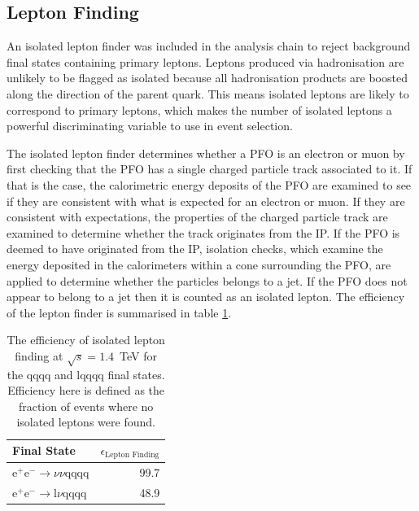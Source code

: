 \begin{figure}
\label{fig:allchi2jetalgoideal1400GeV}
\end{figure}


\subsection{Lepton Finding} 
\label{sec:isolatedleptonfinding}
An isolated lepton finder was included in the analysis chain to reject background final states containing primary leptons.  Leptons produced via hadronisation are unlikely to be flagged as isolated because all hadronisation products are boosted along the direction of the parent quark.  This means isolated leptons are likely to correspond to primary leptons, which makes the number of isolated leptons a powerful discriminating variable to use in event selection.  

The isolated lepton finder determines whether a PFO is an electron or muon by first checking that the PFO has a single charged particle track associated to it.  If that is the case, the calorimetric energy deposits of the PFO are examined to see if they are consistent with what is expected for an electron or muon.  If they are consistent with expectations, the properties of the charged particle track are examined to determine whether the track originates from the IP.  If the PFO is deemed to have originated from the IP, isolation checks, which examine the energy deposited in the calorimeters within a cone surrounding the PFO, are applied to determine whether the particles belongs to a jet.  If the PFO does not appear to belong to a jet then it is counted as an isolated lepton.  The efficiency of the lepton finder is summarised in table \ref{table:efficiencyleptonfinding}.   

\begin{table}[h!]
\centering
\begin{tabular}{ l r }
\hline
Final State & $\epsilon_{\text{Lepton Finding}}$ \\ 
\hline
$\text{e}^{+}\text{e}^{-} \rightarrow \nu{\nu}\text{qqqq}$ & 99.7 \\
$\text{e}^{+}\text{e}^{-} \rightarrow \text{l}\nu\text{qqqq}$ & 48.9 \\
\hline
\end{tabular}
\caption[The efficiency of isolated lepton finding at $\sqrt{s}=1.4$~TeV for the {\nu}{\nu}qqqq and l{\nu}qqqq final states.]{The efficiency of isolated lepton finding at $\sqrt{s}=1.4$~TeV for the {\nu}{\nu}qqqq and l{\nu}qqqq final states.  Efficiency here is defined as the fraction of events where no isolated leptons were found.}
\label{table:efficiencyleptonfinding}
\end{table}

